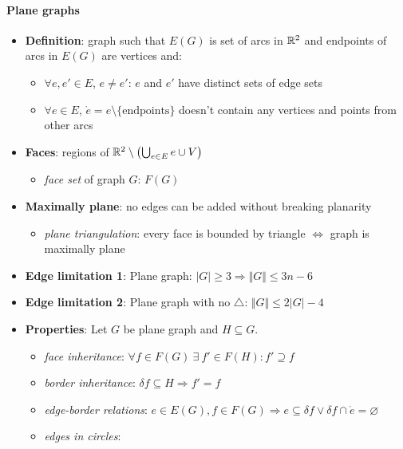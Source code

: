 \paragraph{Plane graphs}
\begin{itemize}
  \item \textbf{Definition}: graph such that $ E(G) $ is set of arcs in $ \mathbb{R}^2 $ and endpoints of arcs in $ E(G) $ are vertices and:
  \begin{itemize}
    \item $ \forall e, e' \in E $, $ e \neq e' $: $ e $ and $ e' $ have distinct sets of edge sets
    \item $ \forall e \in E $, $ \mathring{e} = e \setminus \{ \text{endpoints} \} $ doesn't contain any vertices and points from other arcs 
  \end{itemize}
  \item \textbf{Faces}: regions of $ \mathbb{R}^2 \setminus \left( \bigcup_{e \in E} e \cup V \right) $
  \begin{itemize}
    \item \emph{face set} of graph $ G $: $ F(G) $ 
  \end{itemize}
  \item \textbf{Maximally plane}: no edges can be added without breaking planarity
  \begin{itemize}
    \item \emph{plane triangulation}: every face is bounded by triangle $ \Leftrightarrow $ graph is maximally plane
  \end{itemize}
  \item \textbf{Edge limitation 1}: Plane graph: $ \vert G \vert \geq 3 \Rightarrow \Vert G \Vert \leq 3n-6 $
  \item \textbf{Edge limitation 2}: Plane graph with no $ \triangle $: $ \Vert G \Vert \leq 2\vert G \vert - 4 $
  \item \textbf{Properties}: Let $ G $ be plane graph and $ H \subseteq G $.
  \begin{itemize}
    \item \emph{face inheritance}: $ \forall f \in F(G) \ \exists \ f' \in F(H) : f' \supseteq f $ 
    \item \emph{border inheritance}: $ \delta f \subseteq H \Rightarrow f' = f $
    \item \emph{edge-border relations}: $ e \in E(G), f \in F(G) \Rightarrow e \subseteq \delta f \vee \delta f \cap \mathring{e} = \varnothing $
    \item \emph{edges in circles}:
      \begin{align*}

\end{align*}
\end{itemize}
\end{itemize}
